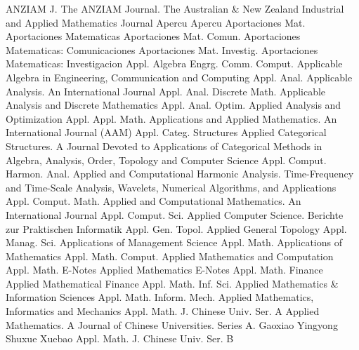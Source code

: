 {ANZIAM J.}
{The ANZIAM Journal. The Australian & New Zealand Industrial and Applied Mathematics Journal}
{Apercu}
{Apercu}
{Aportaciones Mat.}
{Aportaciones Matematicas}
{Aportaciones Mat. Comun.}
{Aportaciones Matematicas: Comunicaciones}
{Aportaciones Mat. Investig.}
{Aportaciones Matematicas: Investigacion}
{Appl. Algebra Engrg. Comm. Comput.}
{Applicable Algebra in Engineering, Communication and Computing}
{Appl. Anal.}
{Applicable Analysis. An International Journal}
{Appl. Anal. Discrete Math.}
{Applicable Analysis and Discrete Mathematics}
{Appl. Anal. Optim.}
{Applied Analysis and Optimization}
{Appl. Appl. Math.}
{Applications and Applied Mathematics. An International Journal (AAM)}
{Appl. Categ. Structures}
{Applied Categorical Structures. A Journal Devoted to Applications of Categorical Methods in Algebra, Analysis, Order, Topology and Computer Science}
{Appl. Comput. Harmon. Anal.}
{Applied and Computational Harmonic Analysis. Time-Frequency and Time-Scale Analysis, Wavelets, Numerical Algorithms, and Applications}
{Appl. Comput. Math.}
{Applied and Computational Mathematics. An International Journal}
{Appl. Comput. Sci.}
{Applied Computer Science. Berichte zur Praktischen Informatik}
{Appl. Gen. Topol.}
{Applied General Topology}
{Appl. Manag. Sci.}
{Applications of Management Science}
{Appl. Math.}
{Applications of Mathematics}
{Appl. Math. Comput.}
{Applied Mathematics and Computation}
{Appl. Math. E-Notes}
{Applied Mathematics E-Notes}
{Appl. Math. Finance}
{Applied Mathematical Finance}
{Appl. Math. Inf. Sci.}
{Applied Mathematics & Information Sciences}
{Appl. Math. Inform. Mech.}
{Applied Mathematics, Informatics and Mechanics}
{Appl. Math. J. Chinese Univ. Ser. A}
{Applied Mathematics. A Journal of Chinese Universities. Series A. Gaoxiao Yingyong Shuxue Xuebao}
{Appl. Math. J. Chinese Univ. Ser. B}
